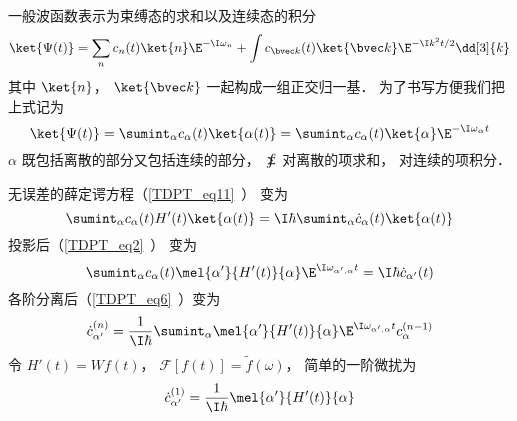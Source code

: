 

一般波函数表示为束缚态的求和以及连续态的积分
\begin{equation}
\ket{\Psi(t)} = \sum_n c_n(t)\ket{n}\E^{-\I\omega_n} + \int c_{\bvec k}(t)\ket{\bvec k}\E^{-\I k^2 t/2} \dd[3]{k}
\end{equation}
其中 $\ket{n}$， $\ket{\bvec k}$ 一起构成一组正交归一基． 为了书写方便我们把上式记为
\begin{equation}
\ket{\Psi(t)} = \sumint_\alpha c_\alpha(t) \ket{\alpha(t)} = \sumint_\alpha c_\alpha(t) \ket{\alpha}\E^{-\I\omega_\alpha t} 
\end{equation}
$\alpha$ 既包括离散的部分又包括连续的部分， $\sumint$ 对离散的项求和， 对连续的项积分．

无误差的薛定谔方程（\autoref{TDPT_eq11}~） 变为
\begin{equation}
\sumint_\alpha c_\alpha(t) H'(t) \ket{\alpha(t)} = \I \hbar \sumint_\alpha \dot c_\alpha(t) \ket{\alpha(t)}
\end{equation}
投影后（\autoref{TDPT_eq2}~） 变为
\begin{equation}
\sumint_\alpha c_\alpha(t) \mel{\alpha'}{H'(t)}{\alpha} \E^{\I \omega_{\alpha',\alpha} t} = \I \hbar \dot c_{\alpha'} (t)
\end{equation}
各阶分离后（\autoref{TDPT_eq6}~）变为
\begin{equation}
\dot c_{\alpha'}^{(n)} = \frac{1}{\I\hbar} \sumint_\alpha \mel{\alpha'}{H'(t)}{\alpha} \E^{\I \omega_{\alpha',\alpha} t} c_{\alpha}^{(n-1)} 
\end{equation}
令 $H'(t) = W f(t)$， $\mathcal F[f(t)] = \tilde f(\omega)$， 简单的一阶微扰为
\begin{equation}
\dot c_{\alpha'}^{(1)} = \frac{1}{\I\hbar} \mel{\alpha'}{H'(t)}{\alpha} 
\end{equation}
